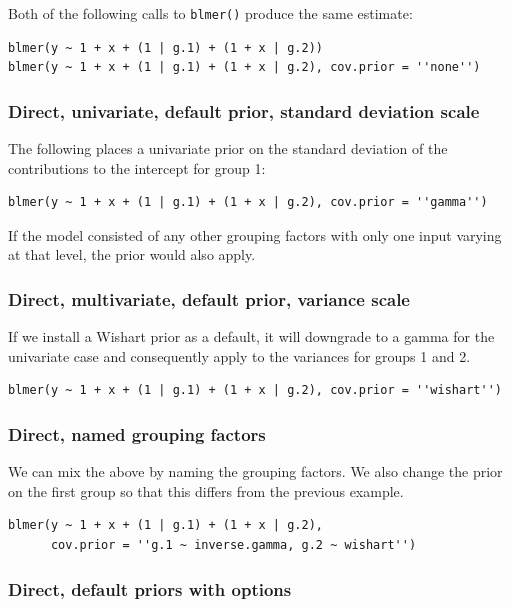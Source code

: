 \documentclass[10pt]{article}
\newcommand{\code}[1]{\texttt{#1}}
\begin{document}
Both of the following calls to \code{blmer()} produce the same estimate:

\begin{verbatim}
blmer(y ~ 1 + x + (1 | g.1) + (1 + x | g.2))
blmer(y ~ 1 + x + (1 | g.1) + (1 + x | g.2), cov.prior = ''none'')
\end{verbatim}

\subsubsection*{Direct, univariate, default prior, standard deviation scale}

The following places a univariate prior on the standard deviation of the
contributions to the intercept for group 1:

\begin{verbatim}
blmer(y ~ 1 + x + (1 | g.1) + (1 + x | g.2), cov.prior = ''gamma'')
\end{verbatim}

If the model consisted of any other grouping factors with only one
input varying at that level, the prior would also apply.

\subsubsection*{Direct, multivariate, default prior, variance scale}

If we install a Wishart prior as a default, it will downgrade to a
gamma for the univariate case and consequently apply to the variances
for groups 1 and 2.

\begin{verbatim}
blmer(y ~ 1 + x + (1 | g.1) + (1 + x | g.2), cov.prior = ''wishart'')
\end{verbatim}

\subsubsection*{Direct, named grouping factors}

We can mix the above by naming the grouping factors. We also change
the prior on the first group so that this differs from the previous example.

\begin{verbatim}
blmer(y ~ 1 + x + (1 | g.1) + (1 + x | g.2),
      cov.prior = ''g.1 ~ inverse.gamma, g.2 ~ wishart'')
\end{verbatim}

\subsubsection*{Direct, default priors with options}
\end{document}
